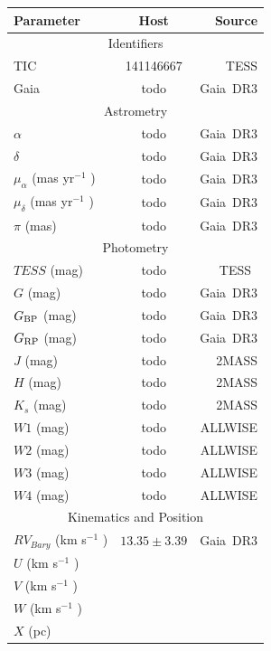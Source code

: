\documentclass{nature3}
\begin{document}
\begin{methods}
%
\begin{table}
    \centering
    \begin{tabular}{lcr}
    \hline 
    \hline
    Parameter & Host & Source \\
    \hline 
    \multicolumn{3}{c}{Identifiers} \\
    \hline
    TIC & 141146667 & TESS \\
    Gaia & todo & Gaia\ DR3 \\
    \hline
    \multicolumn{3}{c}{Astrometry} \\ 
    \hline
    $\alpha$ & todo & Gaia\ DR3 \\
    $\delta$ & todo & Gaia\ DR3 \\
    $\mu_{\alpha}$ (mas yr$^{-1}$ ) & todo & Gaia\ DR3 \\
    $\mu_{\delta}$ (mas yr$^{-1}$ ) & todo & Gaia\ DR3 \\
    $\pi$ (mas) & todo & Gaia\ DR3 \\
    \hline
    \multicolumn{3}{c}{Photometry} \\
    \hline
    $TESS$ (mag) & todo & TESS\ \\
    $G$ (mag) & todo & Gaia\ DR3 \\
    $G_{\rm BP}$ (mag) & todo & Gaia\ DR3\\
    $G_{\rm RP}$ (mag) & todo & Gaia\ DR3\\
    $J$ (mag) & todo & 2MASS\\
    $H$ (mag) & todo & 2MASS\\
    $K_s$ (mag) & todo & 2MASS\\
    $W1$ (mag) & todo & ALLWISE \\
    $W2$ (mag) & todo & ALLWISE \\
    $W3$ (mag) & todo & ALLWISE \\
    $W4$ (mag) & todo & ALLWISE \\
    \hline
    \multicolumn{3}{c}{Kinematics and Position} \\
    \hline
    $RV_{Bary}$ (km s$^{-1}$ ) & $13.35 \pm 3.39$ & Gaia\ DR3 \\
    $U$ (km s$^{-1}$ ) & & \\
    $V$ (km s$^{-1}$ ) & & \\
    $W$ (km s$^{-1}$ ) & & \\
    $X$ (pc)  & & \\

\end{tabular}
\end{table}
\end{methods}
\end{document}
